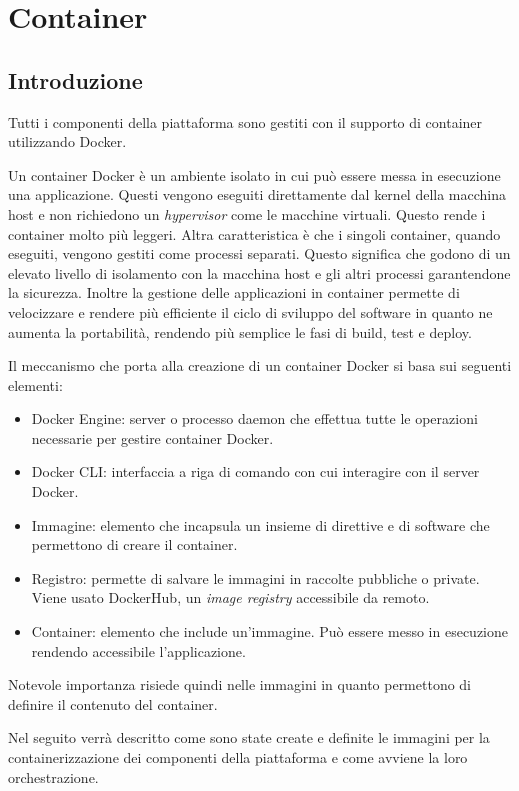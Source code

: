 \section{Container}
\subsection{Introduzione}
Tutti i componenti della piattaforma sono gestiti con il supporto di container utilizzando Docker.

Un container Docker è un ambiente isolato in cui può essere messa in esecuzione una applicazione.
Questi vengono eseguiti direttamente dal kernel della macchina host e non richiedono un \textit{hypervisor} come le
macchine virtuali. Questo rende i container molto più leggeri. Altra caratteristica è che i singoli container,
quando eseguiti, vengono gestiti come processi separati. Questo significa che godono di un elevato livello di isolamento
con la macchina host e gli altri processi garantendone la sicurezza.
Inoltre la gestione delle applicazioni in container permette di velocizzare e rendere più efficiente il ciclo di sviluppo del software in quanto
ne aumenta la portabilità, rendendo più semplice le fasi di build, test e deploy.

Il meccanismo che porta alla creazione di un container Docker si basa sui seguenti elementi:
\begin{itemize}
    \itemsep0em
    \item Docker Engine: server o processo daemon che effettua tutte le operazioni necessarie per gestire container Docker.
    \item Docker CLI: interfaccia a riga di comando con cui interagire con il server Docker.
    \item Immagine: elemento che incapsula un insieme di direttive e di software che permettono di creare il container.
    \item Registro: permette di salvare le immagini in raccolte pubbliche o private. Viene usato DockerHub, un \textit{image registry} accessibile da remoto.
    \item Container: elemento che include un'immagine. Può essere messo in esecuzione rendendo accessibile l'applicazione.
\end{itemize}

Notevole importanza risiede quindi nelle immagini in quanto permettono di definire il contenuto del container.

Nel seguito verrà descritto come sono state create e definite le immagini per la containerizzazione dei componenti della piattaforma
e come avviene la loro orchestrazione.

